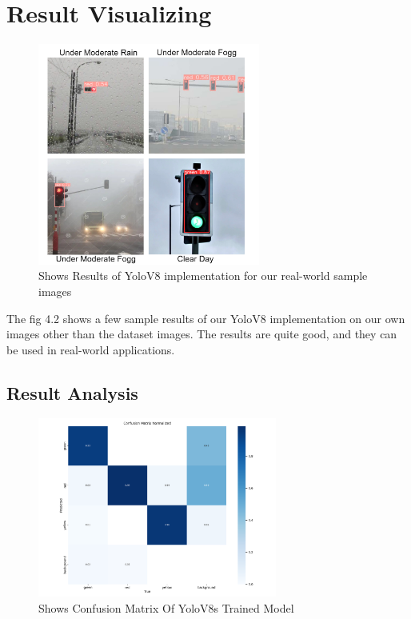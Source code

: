 \documentclass[12 pt]{report}
\begin{document}
\section{Result Visualizing}
{
\begin{figure}[h]
  \centering
  \includegraphics[width=0.65\textwidth]{Results Collgess.jpg}
  \caption{Shows Results of YoloV8 implementation for our real-world sample images}
  \label{fig:Results achieved from YoloV8s Implementation}
\end{figure}
\hspace*{1cm} The fig 4.2 shows a few sample results of our YoloV8 implementation on our own images other than the dataset images. The results are quite good, and they can be used in real-world applications.
\newpage
\subsection{Result Analysis}
{
  \begin{figure}[h]
    \centering
    \includegraphics[width=0.7\textwidth]{confusion_matrix_normalized.png}
    \caption{Shows Confusion Matrix Of YoloV8s Trained Model}
    \label{fig:Confusion Matrix YoloV8 Trained Model}
  \end{figure}

}}
\end{document}
